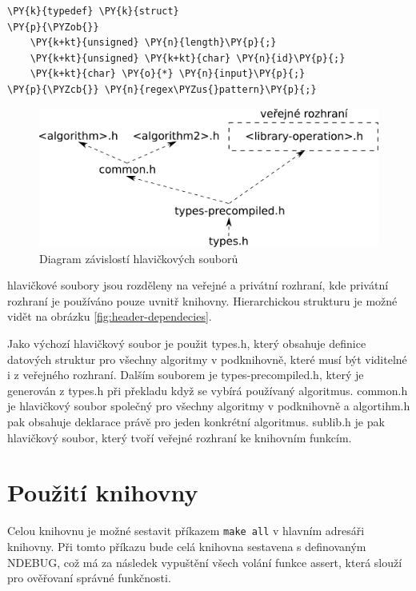 \begin{Verbatim}[commandchars=\\\{\}]
\PY{k}{typedef} \PY{k}{struct}
\PY{p}{\PYZob{}}
	\PY{k+kt}{unsigned} \PY{n}{length}\PY{p}{;}
	\PY{k+kt}{unsigned} \PY{k+kt}{char} \PY{n}{id}\PY{p}{;}
	\PY{k+kt}{char} \PY{o}{*} \PY{n}{input}\PY{p}{;}
\PY{p}{\PYZcb{}} \PY{n}{regex\PYZus{}pattern}\PY{p}{;}
\end{Verbatim}

\begin{figure}[!htb]
	\centering
	\includegraphics[scale=.25]{fig/header-dependencies.pdf}
	\caption{Diagram závislostí hlavičkových souborů}
\end{figure}\label{fig:header-dependecies}

hlavičkové soubory jsou rozděleny na veřejné a privátní rozhraní, kde privátní rozhraní je používáno pouze uvnitř knihovny. Hierarchickou strukturu je možné vidět na obrázku \ref{fig:header-dependecies}.

Jako výchozí hlavičkový soubor je použit types.h, který obsahuje definice datových struktur pro všechny algoritmy v podknihovně, které musí být viditelné i z veřejného rozhraní. Dalším souborem je types-precompiled.h, který je generován z types.h při překladu když se vybírá používaný algoritmus. common.h je hlavičkový soubor společný pro všechny algoritmy v podknihovně a algortihm.h pak obsahuje deklarace právě pro jeden konkrétní algoritmus.
sublib.h je pak hlavičkový soubor, který tvoří veřejné rozhraní ke knihovním funkcím.

\section{Použití knihovny}
Celou knihovnu je možné sestavit příkazem \texttt{make all} v hlavním adresáři knihovny.
Při tomto příkazu bude celá knihovna sestavena s definovaným NDEBUG, což má za následek vypuštění všech
volání funkce assert, která slouží pro ověřovaní správné funkčnosti.

